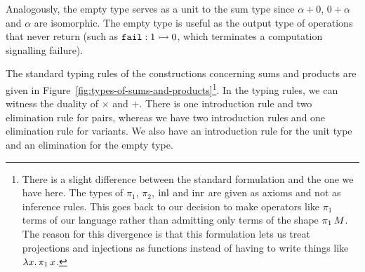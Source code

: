 Analogously, the empty type serves as a unit to the sum type since $\alpha
+ 0$, $0 + \alpha$ and $\alpha$ are isomorphic. The empty type is useful as
the output type of operations that never return (such as
$\mathtt{fail} : 1 \rightarrowtail 0$, which terminates a computation signalling failure).

The standard typing rules of the constructions concerning sums and products
are given in Figure~\ref{fig:types-of-sums-and-products}\footnote{There is
  a slight difference between the standard formulation and the one we have
  here. The types of $\pi_1$, $\pi_2$, $\operatorname{inl}$ and $\operatorname{inr}$ are given as
  axioms and not as inference rules. This goes back to our decision to make
  operators like $\pi_1$ terms of our language rather than admitting only
  terms of the shape $\pi_1\,M$. The reason for this divergence is
  that this formulation lets us treat projections and injections as
  functions instead of having to write things like
  $\lambda x.\, \pi_1\,x$.}. In the typing rules, we can witness the
duality of $\times$ and $+$. There is one introduction rule and two
elimination rule for pairs, whereas we have two introduction rules and one
elimination rule for variants. We also have an introduction rule for the
unit type and an elimination for the empty type.

